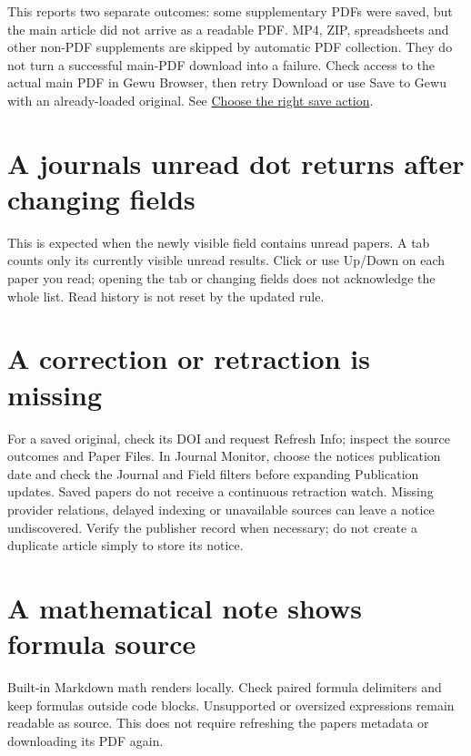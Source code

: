 \documentclass[10pt,letterpaper,oneside]{scrreprt}
\begin{document}
This reports two separate outcomes: some supplementary PDFs were saved, but the main article did not arrive as a readable PDF. MP4, ZIP, spreadsheets and other non-PDF supplements are skipped by automatic PDF collection. They do not turn a successful main-PDF download into a failure. Check access to the actual main PDF in Gewu Browser, then retry Download or use Save to Gewu with an already-loaded original. See \hyperref[browser-save-choices]{Choose the right save action}.

\section{A journal\textquotesingle s unread dot returns after changing fields}\label{a-journals-unread-dot-returns-after-changing-fields}

This is expected when the newly visible field contains unread papers. A tab counts only its currently visible unread results. Click or use Up/Down on each paper you read; opening the tab or changing fields does not acknowledge the whole list. Read history is not reset by the updated rule.

\section{A correction or retraction is missing}\label{a-correction-or-retraction-is-missing}

For a saved original, check its DOI and request Refresh Info; inspect the source outcomes and Paper Files. In Journal Monitor, choose the notice\textquotesingle s publication date and check the Journal and Field filters before expanding Publication updates. Saved papers do not receive a continuous retraction watch. Missing provider relations, delayed indexing or unavailable sources can leave a notice undiscovered. Verify the publisher record when necessary; do not create a duplicate article simply to store its notice.

\section{A mathematical note shows formula source}\label{a-mathematical-note-shows-formula-source}

Built-in Markdown math renders locally. Check paired formula delimiters and keep formulas outside code blocks. Unsupported or oversized expressions remain readable as source. This does not require refreshing the paper\textquotesingle s metadata or downloading its PDF again.
\end{document}
